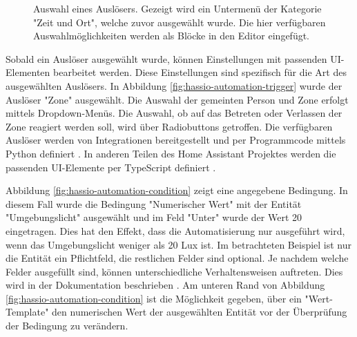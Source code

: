 \begin{figure}[!ht]
\begin{minipage}[t]{\hascwidth}
    \caption[Auswahl eines Auslösers in Home Assistant]{Auswahl eines Auslösers. Gezeigt wird ein Untermenü der Kategorie "Zeit und Ort", welche zuvor ausgewählt wurde. Die hier verfügbaren Auswahlmöglichkeiten werden als Blöcke in den Editor eingefügt.}
    \label{fig:hassio-automation-trigger-select-2}
  \end{minipage}
\end{figure}

Sobald ein Auslöser ausgewählt wurde, können Einstellungen mit passenden UI-Elementen bearbeitet werden. Diese Einstellungen sind spezifisch für die Art des ausgewählten Auslösers. In Abbildung \ref{fig:hassio-automation-trigger} wurde der Auslöser "Zone" ausgewählt. Die Auswahl der gemeinten Person und Zone erfolgt mittels Dropdown-Menüs. Die Auswahl, ob auf das Betreten oder Verlassen der Zone reagiert werden soll, wird über Radiobuttons getroffen. Die verfügbaren Auslöser werden von Integrationen bereitgestellt und per Programmcode mittels Python definiert \parencite{openhomefoundationDeviceAutomations2023}. In anderen Teilen des Home Assistant Projektes werden die passenden \ac{UI}-Elemente per TypeScript definiert \parencite{openhomefoundationHomeassistantFrontend}.

Abbildung \ref{fig:hassio-automation-condition} zeigt eine angegebene Bedingung. In diesem Fall wurde  die Bedingung "Numerischer Wert" mit der Entität "Umgebungslicht" ausgewählt und im Feld "Unter" wurde der Wert 20 eingetragen. Dies hat den Effekt, dass die Automatisierung nur ausgeführt wird, wenn das Umgebungslicht weniger als 20 Lux ist. Im betrachteten Beispiel ist nur die Entität ein Pflichtfeld, die restlichen Felder sind optional. Je nachdem welche Felder ausgefüllt sind, können unterschiedliche Verhaltensweisen auftreten. Dies wird in der Dokumentation beschrieben \parencite{openhomefoundationConditions}. Am unteren Rand von Abbildung \ref{fig:hassio-automation-condition} ist die Möglichkeit gegeben, über ein "Wert-Template" den numerischen Wert der ausgewählten Entität vor der Überprüfung der Bedingung zu verändern.

